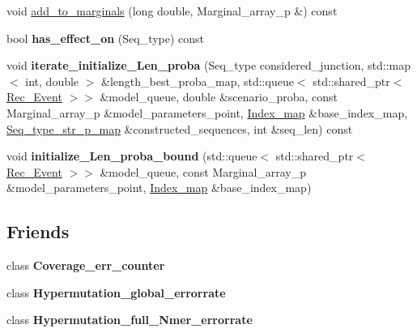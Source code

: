 \begin{DoxyCompactItemize}
\item 
void \hyperlink{classGene__choice_ac1d61da5a319518f24af8da2e1e6435a}{add\+\_\+to\+\_\+marginals} (long double, Marginal\+\_\+array\+\_\+p \&) const
\item 
\mbox{\label{classGene__choice_addb3eb932abb73591f123039f06cc4e8}} 
bool {\bfseries has\+\_\+effect\+\_\+on} (Seq\+\_\+type) const
\item 
\mbox{\label{classGene__choice_a6d9d5bb6b3db54ecba7476ad4551f6cc}} 
void {\bfseries iterate\+\_\+initialize\+\_\+\+Len\+\_\+proba} (Seq\+\_\+type considered\+\_\+junction, std\+::map$<$ int, double $>$ \&length\+\_\+best\+\_\+proba\+\_\+map, std\+::queue$<$ std\+::shared\+\_\+ptr$<$ \hyperlink{classRec__Event}{Rec\+\_\+\+Event} $>$$>$ \&model\+\_\+queue, double \&scenario\+\_\+proba, const Marginal\+\_\+array\+\_\+p \&model\+\_\+parameters\+\_\+point, \hyperlink{classEnum__fast__memory__map}{Index\+\_\+map} \&base\+\_\+index\+\_\+map, \hyperlink{classEnum__fast__memory__map}{Seq\+\_\+type\+\_\+str\+\_\+p\+\_\+map} \&constructed\+\_\+sequences, int \&seq\+\_\+len) const
\item 
\mbox{\label{classGene__choice_a916aec7655d44275ffce9f19acee4b4d}} 
void {\bfseries initialize\+\_\+\+Len\+\_\+proba\+\_\+bound} (std\+::queue$<$ std\+::shared\+\_\+ptr$<$ \hyperlink{classRec__Event}{Rec\+\_\+\+Event} $>$$>$ \&model\+\_\+queue, const Marginal\+\_\+array\+\_\+p \&model\+\_\+parameters\+\_\+point, \hyperlink{classEnum__fast__memory__map}{Index\+\_\+map} \&base\+\_\+index\+\_\+map)
\end{DoxyCompactItemize}
\subsection*{Friends}
\begin{DoxyCompactItemize}
\item 
\mbox{\label{classGene__choice_ad4a26da5a0e142c5135c983af6d042d6}} 
class {\bfseries Coverage\+\_\+err\+\_\+counter}
\item 
\mbox{\label{classGene__choice_ad5a47907bf54eec60bc584c426aaca7f}} 
class {\bfseries Hypermutation\+\_\+global\+\_\+errorrate}
\item 
\mbox{\label{classGene__choice_a5ff5d89d255ca8ca355c6da8c4be7f68}} 
class {\bfseries Hypermutation\+\_\+full\+\_\+\+Nmer\+\_\+errorrate}
\end{DoxyCompactItemize}
